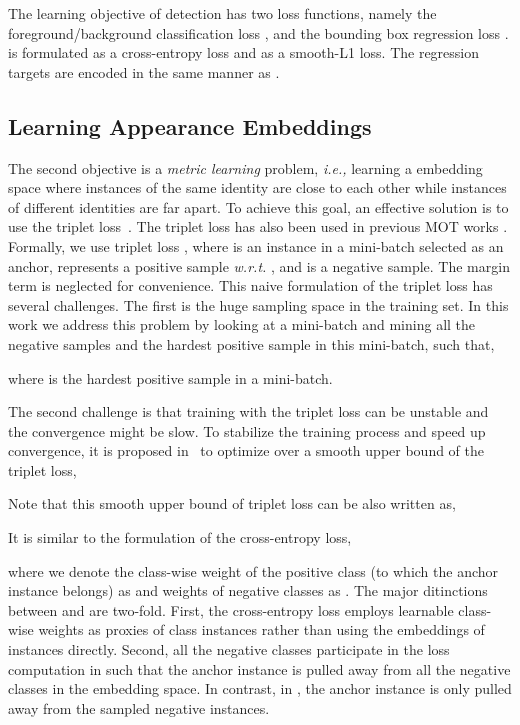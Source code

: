 \documentclass[runningheads]{llncs}
\def\wrt{\textit{w.r.t. }}
\begin{document}
The learning objective of detection has two loss functions, namely the foreground/background classification loss , and the bounding box regression loss .   is formulated as a cross-entropy loss and  as a smooth-L1 loss. The regression targets are encoded in the same manner as \cite{faster}.

\subsection{Learning Appearance Embeddings}
The second objective is a \emph{metric learning} problem, \emph{i.e.,} learning a embedding space where instances of the same identity are close to each other while instances of different identities are far apart.
To achieve this goal, an effective solution is to use the triplet loss~\cite{triplet}. The triplet loss has also been used in previous MOT works \cite{MOTS}. Formally, we use triplet loss
,
where  is an instance in a mini-batch selected as an anchor,  represents a positive sample \wrt , and  is a negative sample. The margin term is neglected for convenience.
This naive formulation of the triplet loss has several challenges. The first is the huge sampling space in the training set. In this work we address this problem by looking at a mini-batch and mining all the negative samples and the hardest positive sample in this mini-batch, such that,

where  is the hardest positive sample in a mini-batch.

The second challenge is that training with the triplet loss can be unstable and the convergence might be slow. To stabilize the training process and speed up convergence, it is proposed in~\cite{npair} to optimize over a smooth upper bound of the triplet loss,


Note that this smooth upper bound of triplet loss can be also written as,

It is similar to the formulation of the cross-entropy loss,

where we denote the class-wise weight of the positive class (to which the anchor instance belongs) as  and weights of negative classes as . The major ditinctions between  and  are two-fold. First, the cross-entropy loss employs learnable class-wise weights as proxies of class instances rather than using the embeddings of instances directly. Second, all the negative classes participate in the loss computation in  such that the anchor instance is pulled away from all the negative classes in the embedding space. In contrast, in , the anchor instance is only pulled away from the sampled negative instances.
\end{document}
